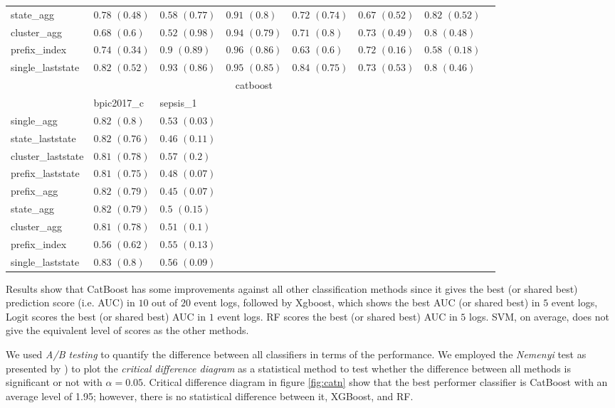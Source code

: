 \begin{table}[!htbp]
{\begin{tabular}{llllllll}
			state\_agg & $0.78$ ${(0.48)}$ & $0.58$ ${(0.77)}$ & $0.91$ ${(0.8)}$ & $0.72$ ${(0.74)}$ & $0.67$ ${(0.52)}$ & $\mathbf{0.82}$ $\mathbf{(0.52)}$  \\
			cluster\_agg & $0.68$ ${(0.6)}$ & $0.52$ ${(0.98)}$ & $0.94$ ${(0.79)}$ & $0.71$ ${(0.8)}$ & $0.73$ ${(0.49)}$ & $0.8$ ${(0.48)}$ \\
			prefix\_index & $0.74$ ${(0.34)}$ & $0.9$ ${(0.89)}$ & $0.96$ ${(0.86)}$ & $0.63$ ${(0.6)}$ & $0.72$ ${(0.16)}$ & $0.58$ ${(0.18)}$ \\
			single\_laststate & $0.82$ ${(0.52)}$ & $0.93$ ${(0.86)}$ & $0.95$ ${(0.85)}$ & $0.84$ ${(0.75)}$ & $0.73$ ${(0.53)}$ & $0.8$ ${(0.46)}$ \\
			\bottomrule
			\toprule
			& \multicolumn{5}{c}{catboost}
			\\
			& bpic2017\_c & sepsis\_1
			\\ \midrule
			single\_agg & $0.82$ ${(0.8)}$ & $0.53$ ${(0.03)}$ \\
			state\_laststate & $0.82$ ${(0.76)}$ & $0.46$ ${(0.11)}$ \\
			cluster\_laststate & $0.81$ ${(0.78)}$ & $\mathbf{0.57}$ $\mathbf{(0.2)}$  \\
			prefix\_laststate & $0.81$ ${(0.75)}$ & $0.48$ ${(0.07)}$ \\
			prefix\_agg & $0.82$ ${(0.79)}$ & $0.45$ ${(0.07)}$ \\
			state\_agg & $0.82$ ${(0.79)}$ & $0.5$ ${(0.15)}$ \\
			cluster\_agg & $0.81$ ${(0.78)}$ & $0.51$ ${(0.1)}$ \\
			prefix\_index & $0.56$ ${(0.62)}$ & $0.55$ ${(0.13)}$ \\
			single\_laststate & $0.83$ ${(0.8)}$ & $0.56$ ${(0.09)}$ \\
			\bottomrule
			
			
		\end{tabular}%
	}
\end{table}

Results show that CatBoost has some improvements against all other classification methods since it gives the best (or shared best) prediction score (i.e. AUC) in $10$ out of $20$ event logs, followed by Xgboost, which shows the best AUC (or shared best) in $5$ event logs, Logit scores the best (or shared best) AUC in $1$ event logs. RF scores the best (or shared best) AUC in $5$ logs. SVM, on average, does not give the equivalent level of scores as the other methods.


We used \textit{A/B testing} to quantify the difference between all classifiers in terms of the performance. We employed the \textit{Nemenyi} test as presented by \cite{demvsar2006statistical}) to plot the \textit{critical difference diagram} as a statistical method to test whether the difference between all methods is significant or not with $\alpha = 0.05$. Critical difference diagram in figure \ref{fig:catn} show that the best performer classifier is CatBoost with an average level of 1.95; however, there is no statistical difference between it, XGBoost, and RF. 



